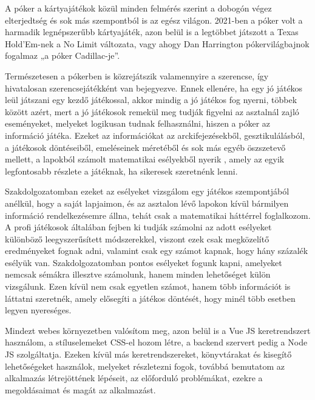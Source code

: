 
A póker a kártyajátékok közül minden felmérés szerint a dobogón végez elterjedtség és sok más szempontból is az egész világon. 2021-ben a póker volt a harmadik legnépszerűbb kártyajáték, azon belül is a legtöbbet játszott a Texas Hold’Em-nek a No Limit változata, vagy ahogy Dan Harrington pókervilágbajnok fogalmaz „a póker Cadillac-je”. 

Természetesen a pókerben is közrejátszik valamennyire a szerencse, így hivatalosan szerencsejátékként van bejegyezve. Ennek ellenére, ha egy jó játékos leül játszani egy kezdő játékossal, akkor mindig a jó játékos fog nyerni, többek között azért, mert a jó játékosok remekül meg tudják figyelni az asztalnál zajló eseményeket, melyeket logikusan tudnak felhasználni, hiszen a póker az információ játéka. Ezeket az információkat az arckifejezésekből, gesztikulálásból, a játékosok döntéseiből, emeléseinek méretéből és sok más egyéb öszszetevő mellett, a lapokból számolt matematikai esélyekből nyerik , amely az egyik legfontosabb részlete a játéknak, ha sikeresek szeretnénk lenni.

Szakdolgozatomban ezeket az esélyeket vizsgálom egy játékos szempontjából anélkül, hogy a saját lapjaimon, és az asztalon lévő lapokon kívül bármilyen információ rendelkezésemre állna, tehát csak a matematikai háttérrel foglalkozom. A profi játékosok általában fejben ki tudják számolni az adott esélyeket különböző leegyszerűsített módszerekkel, viszont ezek csak megközelítő eredményeket fognak adni, valamint csak egy számot kapnak, hogy hány százalék esélyük van. Szakdolgozatomban pontos esélyeket fogunk kapni, amelyeket nemcsak sémákra illesztve számolunk, hanem minden lehetőséget külön vizsgálunk. Ezen kívül nem csak egyetlen számot, hanem több információt is láttatni szeretnék, amely elősegíti a játékos döntését, hogy minél több esetben legyen nyereséges.

Mindezt webes környezetben valósítom meg, azon belül is a Vue JS keretrendszert használom, a stíluselemeket CSS-el hozom létre, a backend szervert pedig a Node JS szolgáltatja. Ezeken kívül más keretrendszereket, könyvtárakat és kisegítő lehetőségeket használok, melyeket részletezni fogok, továbbá bemutatom az alkalmazás létrejöttének lépéseit, az előforduló problémákat, ezekre a megoldásaimat és magát az alkalmazást. 